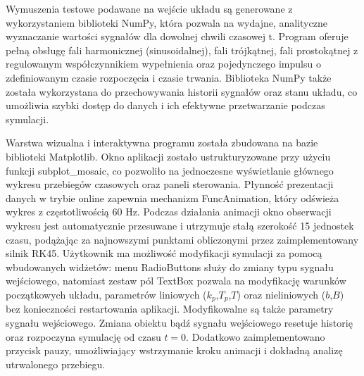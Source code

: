 \documentclass[a4paper]{article}
\begin{document}
Wymuszenia testowe podawane na wejście układu są generowane z wykorzystaniem biblioteki NumPy, która pozwala na wydajne, analityczne wyznaczanie wartości sygnałów dla dowolnej chwili czasowej t. Program
oferuje pełną obsługę fali harmonicznej (sinusoidalnej), fali trójkątnej, fali prostokątnej z regulowanym współczynnikiem wypełnienia oraz pojedynczego impulsu o zdefiniowanym czasie rozpoczęcia i czasie trwania.
Biblioteka NumPy także została wykorzystana do przechowywania historii sygnałów oraz stanu układu, co umożliwia szybki dostęp do danych i ich efektywne przetwarzanie podczas symulacji.

Warstwa wizualna i interaktywna programu została zbudowana na bazie biblioteki Matplotlib. Okno aplikacji zostało ustrukturyzowane przy użyciu funkcji subplot\_mosaic, co pozwoliło na jednoczesne wyświetlanie głównego
wykresu przebiegów czasowych oraz paneli sterowania. Płynność prezentacji danych w trybie online zapewnia mechanizm FuncAnimation, który odświeża wykres z częstotliwością 60 Hz. Podczas działania animacji okno obserwacji
wykresu jest automatycznie przesuwane i utrzymuje stałą szerokość 15 jednostek czasu, podążając za najnowszymi punktami obliczonymi przez zaimplementowany silnik RK45. Użytkownik ma możliwość modyfikacji symulacji
za pomocą wbudowanych widżetów: menu RadioButtons służy do zmiany typu sygnału wejściowego, natomiast zestaw pól TextBox pozwala na modyfikację warunków początkowych układu, parametrów liniowych ($k_p$,$T_p$,$T$) oraz
nieliniowych ($b$,$B$) bez konieczności restartowania aplikacji. Modyfikowalne są także parametry sygnału wejściowego. Zmiana obiektu bądź sygnału wejściowego resetuje historię oraz rozpoczyna symulację od czasu $t=0$.
Dodatkowo zaimplementowano przycisk pauzy, umożliwiający wstrzymanie kroku animacji i dokładną analizę utrwalonego przebiegu.
\end{document}
